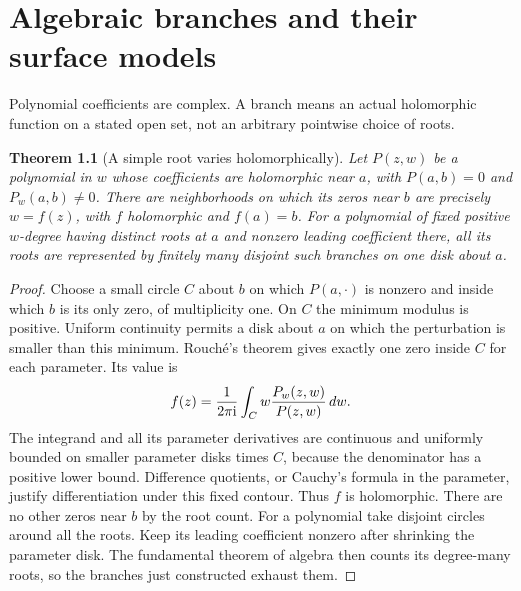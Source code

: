 \documentclass[11pt,a4paper,openany]{book}
\newtheorem{theorem}{Theorem}[chapter]
\theoremstyle{definition}
\theoremstyle{remark}\newtheorem{remark}[theorem]{Remark}
\newcommand{\family}[1]{}
\begin{document}

\chapter{Algebraic branches and their surface models}\label{ch:d12-21}

Polynomial coefficients are complex. A branch means an actual holomorphic
function on a stated open set, not an arbitrary pointwise choice of roots.

\begin{theorem}[A simple root varies holomorphically]\label{d12:21-01}\family{D12.21.01}
Let $P(z,w)$ be a polynomial in $w$ whose coefficients are holomorphic
near $a$, with $P(a,b)=0$ and
$P_w(a,b)\ne0$. There are neighborhoods on which its zeros near $b$
are precisely $w=f(z)$, with $f$ holomorphic and $f(a)=b$.
For a polynomial of fixed positive $w$-degree having distinct roots at
$a$ and nonzero leading coefficient there, all its roots are represented
by finitely many disjoint such branches on one disk about $a$.
\end{theorem}
\begin{proof}
Choose a small circle $C$ about $b$ on which $P(a,\cdot)$ is nonzero
and inside which $b$ is its only zero, of multiplicity one. On $C$ the
minimum modulus is positive. Uniform continuity permits a disk about
$a$ on which the perturbation is smaller than this minimum. Rouch\'e's
theorem gives exactly one zero inside $C$ for each parameter. Its value is
\[
                  f(z)=\frac1{2\pi\mathrm i}\int_C
                       w\frac{P_w(z,w)}{P(z,w)}\,dw.
\]
The integrand and all its parameter derivatives are continuous and
uniformly bounded on smaller parameter disks times $C$, because the
denominator has a positive lower bound. Difference quotients, or Cauchy's
formula in the parameter, justify differentiation under this fixed
contour. Thus $f$ is holomorphic. There are no other zeros near $b$ by
the root count. For a polynomial take disjoint circles around all the
roots. Keep its leading coefficient nonzero after shrinking the parameter
disk. The fundamental theorem of algebra then counts its degree-many
roots, so the branches just constructed exhaust them.
\end{proof}
\end{document}
